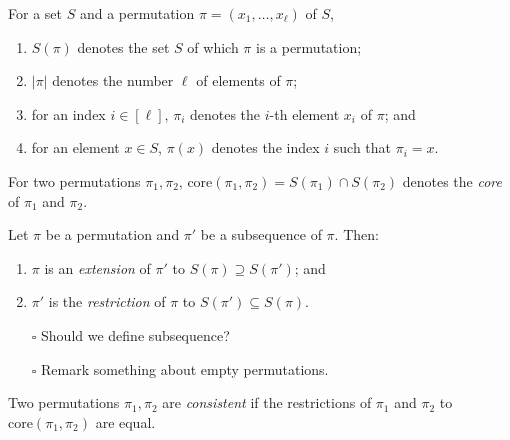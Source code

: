 \documentclass[fontsize=11pt,paper=a4]{book}
\begin{document}
\begin{notation}
For a set \(S\) and a permutation \(\pi=(x_1,\dots,x_{\ell})\) of \(S\),

\begin{enumerate}
\item \label{itm:notation-permutation-1}
\(S(\pi)\) denotes the set \(S\) of which \(\pi\) is a permutation;

\item \label{itm:notation-permutation-2}
\(\lvert\pi\rvert\) denotes the number \(\ell\) of elements of \(\pi\);

\item \label{itm:notation-permutation-3}
for an index \(i\in[\ell]\), \(\pi_i\) denotes the \(i\)-th element \(x_i\) of \(\pi\); and

\item \label{itm:notation-permutation-4}
for an element \(x\in S\), \(\pi(x)\) denotes the index \(i\) such that \(\pi_i=x\).
\end{enumerate}
\label{org8a1f029}
\end{notation}

\begin{notation}
For two permutations \(\pi_1,\pi_2\), \(\mathrm{core}(\pi_1,\pi_2)=S(\pi_1)\cap S(\pi_2)\) denotes the \emph{core} of \(\pi_1\) and \(\pi_2\).
\label{org2e535d7}
\end{notation}

\begin{defn}
Let \(\pi\) be a permutation and \(\pi'\) be a subsequence of \(\pi\). Then:

\begin{enumerate}
\item \(\pi\) is an \emph{extension} of \(\pi'\) to \(S(\pi)\supseteq S(\pi')\); and

\item \(\pi'\) is the \emph{restriction} of \(\pi\) to \(S(\pi')\subseteq S(\pi)\).
\end{enumerate}
\label{org065f525}
\end{defn}

\begin{itemize}
\item[{$\square$}] Should we define subsequence?
\item[{$\square$}] Remark something about empty permutations.
\end{itemize}

\begin{defn}
Two permutations \(\pi_1,\pi_2\) are \emph{consistent} if the restrictions of \(\pi_1\) and \(\pi_2\) to \(\mathrm{core}(\pi_1,\pi_2)\) are equal.
\label{org95e114c}
\end{defn}
\end{document}
